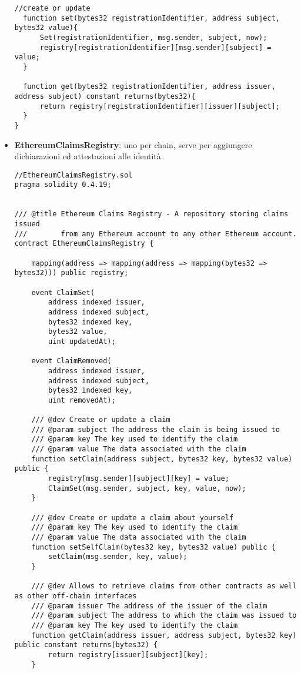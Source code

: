 \begin{itemize}
\begin{lstlisting}[language=Solidity]
  //create or update
  function set(bytes32 registrationIdentifier, address subject, bytes32 value){
      Set(registrationIdentifier, msg.sender, subject, now);
      registry[registrationIdentifier][msg.sender][subject] = value;
  }

  function get(bytes32 registrationIdentifier, address issuer, address subject) constant returns(bytes32){
      return registry[registrationIdentifier][issuer][subject];
  }
}
  \end{lstlisting}

  \item \textbf{EthereumClaimsRegistry}: uno per chain, serve per aggiungere dichiarazioni ed attestazioni alle identità.
  
  \begin{lstlisting}[language=Solidity]
//EthereumClaimsRegistry.sol
pragma solidity 0.4.19;


/// @title Ethereum Claims Registry - A repository storing claims issued
///        from any Ethereum account to any other Ethereum account.
contract EthereumClaimsRegistry {

    mapping(address => mapping(address => mapping(bytes32 => bytes32))) public registry;

    event ClaimSet(
        address indexed issuer,
        address indexed subject,
        bytes32 indexed key,
        bytes32 value,
        uint updatedAt);

    event ClaimRemoved(
        address indexed issuer,
        address indexed subject,
        bytes32 indexed key,
        uint removedAt);

    /// @dev Create or update a claim
    /// @param subject The address the claim is being issued to
    /// @param key The key used to identify the claim
    /// @param value The data associated with the claim
    function setClaim(address subject, bytes32 key, bytes32 value) public {
        registry[msg.sender][subject][key] = value;
        ClaimSet(msg.sender, subject, key, value, now);
    }

    /// @dev Create or update a claim about yourself
    /// @param key The key used to identify the claim
    /// @param value The data associated with the claim
    function setSelfClaim(bytes32 key, bytes32 value) public {
        setClaim(msg.sender, key, value);
    }

    /// @dev Allows to retrieve claims from other contracts as well as other off-chain interfaces
    /// @param issuer The address of the issuer of the claim
    /// @param subject The address to which the claim was issued to
    /// @param key The key used to identify the claim
    function getClaim(address issuer, address subject, bytes32 key) public constant returns(bytes32) {
        return registry[issuer][subject][key];
    }


\end{lstlisting}
\end{itemize}
